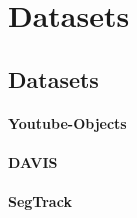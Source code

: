 \section{Datasets}

\subsection{Datasets}
\paragraph{Youtube-Objects~\cite{prest2012learning}} 

\paragraph{DAVIS~\cite{DAVIS2016,DAVIS2017,DAVIS2018}}

\paragraph{SegTrack~\cite{SegTrack}}
